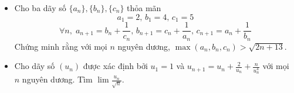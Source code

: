 \documentclass[11pt]{scrartcl}
\begin{document}
\begin{itemize}[label=, leftmargin=0em, itemsep=0.5em]
\begin{btvn}
    \end{btvn}
    \item \begin{btvn}
    Cho ba dãy số $\{a_n\},\{b_n\},\{c_n\}$ thỏa mãn
    \[a_1=2,\,b_1=4,\,c_1=5\]
    \[\forall n,\; a_{n+1}=b_n+\frac{1}{c_n}, \, b_{n+1}=c_n+\frac{1}{a_n}, \, c_{n+1}=a_n+\frac{1}{b_n}\]
    Chứng minh rằng với mọi $n$ nguyên dương, $\max(a_n,b_n,c_n)>\sqrt{2n+13}$.
    \end{btvn}
    \item \begin{btvn}
        Cho dãy số $(u_n)$ được xác định bởi $u_1 = 1$ và $u_{n + 1} = u_n + \frac{2}{u_n} + \frac{n}{u_n^4}$ với mọi $n$ nguyên dương. Tìm $\lim \frac{u_n}{\sqrt{n}}$.
        

\end{btvn}
\end{itemize}
\end{document}

